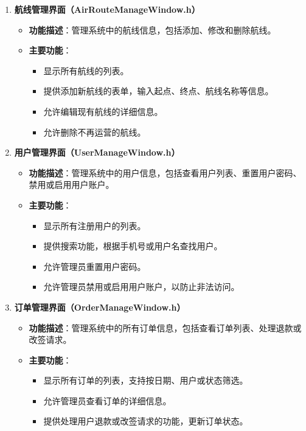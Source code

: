 \documentclass[UTF8, a4paper,12pt]{ctexart}
\begin{document}
\begin{enumerate}
    \item \textbf{航线管理界面（AirRouteManageWindow.h）}
    \begin{itemize}
        \item \textbf{功能描述}：管理系统中的航线信息，包括添加、修改和删除航线。
        \item \textbf{主要功能}：
        \begin{itemize}
            \item 显示所有航线的列表。
            \item 提供添加新航线的表单，输入起点、终点、航线名称等信息。
            \item 允许编辑现有航线的详细信息。
            \item 允许删除不再运营的航线。
        \end{itemize}
    \end{itemize}
    
    \item \textbf{用户管理界面（UserManageWindow.h）}
    \begin{itemize}
        \item \textbf{功能描述}：管理系统中的用户信息，包括查看用户列表、重置用户密码、禁用或启用用户账户。
        \item \textbf{主要功能}：
        \begin{itemize}
            \item 显示所有注册用户的列表。
            \item 提供搜索功能，根据手机号或用户名查找用户。
            \item 允许管理员重置用户密码。
            \item 允许管理员禁用或启用用户账户，以防止非法访问。
        \end{itemize}
    \end{itemize}
    
    \item \textbf{订单管理界面（OrderManageWindow.h）}
    \begin{itemize}
        \item \textbf{功能描述}：管理系统中的所有订单信息，包括查看订单列表、处理退款或改签请求。
        \item \textbf{主要功能}：
        \begin{itemize}
            \item 显示所有订单的列表，支持按日期、用户或状态筛选。
            \item 允许管理员查看订单的详细信息。
            \item 提供处理用户退款或改签请求的功能，更新订单状态。
        \end{itemize}
    \end{itemize}
    

\end{enumerate}
\end{document}
